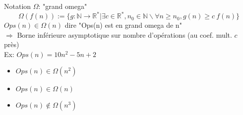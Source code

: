 \documentclass{article}
\begin{document}
\begin{preview}
Notation $\Omega$: "grand omega"
    $$\Omega(f(n)) := \{g: \mathbb{N} \rightarrow \mathbb{R}^* | \exists c \in \mathbb{R}^*, n_0 \in \mathbb{N} \backslash \forall n \geq n_0, g(n) \geq c~f(n)\}$$
    $Ops(n) \in \Omega(n)$ dire "Ops(n) est en grand omega de n"\\
    $\Rightarrow$ Borne inférieure asymptotique sur nombre d'opérations (au coef. mult. $c$ près)\\
    Ex:  $Ops(n) = 10 n^2 - 5 n + 2$
    \begin{minipage}{0.5\textwidth}
    \begin{itemize}
        \item $Ops(n) \in \Omega(n^2)$
        \item $Ops(n) \in \Omega(n)$
        \item $Ops(n) \not\in \Omega(n^3)$
    \end{itemize}
    \end{minipage}
 \end{preview}
\end{document}
